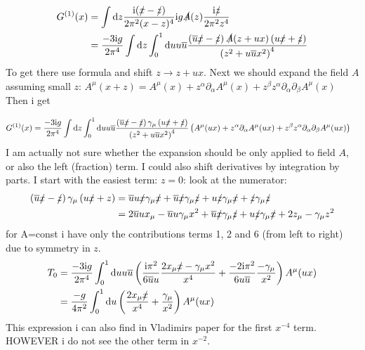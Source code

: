 \begin{align}
	G^{(1)}(x) 
	&=  \int \text{d} z \frac{\text{i}(\slashed x - \slashed z)}{2\pi^2(x-z)^4} \text{i} g \slashed A (z) \frac{\text{i} \slashed z}{2\pi^2z^4}
	\\
	&= \frac{-3\text{i} g}{2\pi^4}\int \text{d} z \int_0^1 \text{d} u u \overline u \frac{\left(\overline u \slashed x - \slashed z\right) \slashed A(z+ux)\left(u \slashed x + \slashed z\right)}{\left(z^2+u\overline u x^2\right)^4} 
\end{align}
To get there use formula  and shift $z \rightarrow z+ux$. Next we should expand the field $A$ assuming small $z$: $ A^\mu(x+z) = A^\mu(x) + z^\alpha\partial_\alpha A^\mu(x) + z^\beta z^\alpha\partial_\alpha \partial_\beta A^\mu(x) $ 
Then i get

\begin{align}
G^{(1)}(x) 
&= 
\frac{-3\text{i} g}{2\pi^4}\int \text{d} z \int_0^1 \text{d} u u \overline u \frac{\left(\overline u \slashed x - \slashed z\right)\gamma_\mu\left(u \slashed x + \slashed z\right)}{\left(z^2+u\overline u x^2\right)^4} \left(A^\mu(ux) + z^\alpha\partial_\alpha A^\mu(ux) + z^\beta z^\alpha\partial_\alpha \partial_\beta A^\mu(ux) \right)
\end{align}
I am actually not sure whether the expansion should be only applied to field $A$, or also the left (fraction) term. I could also shift derivatives by integration by parts.
I start with the easiest term: $z=0$:
look at the numerator: 
\begin{align}
	\left(\overline u\slashed x - \slashed z\right)  \gamma_\mu \left( u \slashed x + z \right) 
	&=
	\overline u u \slashed x \gamma_\mu \slashed x + \overline u \slashed x \gamma_\mu \slashed z + u \slashed z \gamma_\mu \slashed x +\slashed z \gamma_\mu \slashed z
	\\	
	&=
	2\overline u u x_\mu - \overline u u\gamma_\mu x^2 + \overline u \slashed x \gamma_\mu \slashed z + u \slashed z \gamma_\mu \slashed x +2 z_\mu - \gamma_\mu z^2
\end{align}
for A=const i have only the contributions terms 1, 2 and 6 (from left to right) due to symmetry in $z$.
\begin{align}
	T_0 
	&=
	\frac{-3\text{i} g}{2\pi^4}\int_0^1\text{d} u u \overline u \left(\frac{\text{i}\pi^2}{6\overline u u } \frac{2 x_\mu \slashed x - \gamma_\mu x^2}{x^4} + \frac{-2\text{i}\pi^2}{6u\overline u }\frac{-\gamma_\mu}{x^2} \right)A^\mu(ux)
	\\
	&=
	\frac{-g}{4\pi^2}\int_0^1\text{d} u \left( \frac{2 x_\mu \slashed x }{x^4} + \frac{\gamma_\mu}{x^2} \right)A^\mu(ux)
\end{align}
This expression i can also find in Vladimirs paper for the first $x^{-4}$ term. HOWEVER i do not see the other term in $x^{-2}$.
